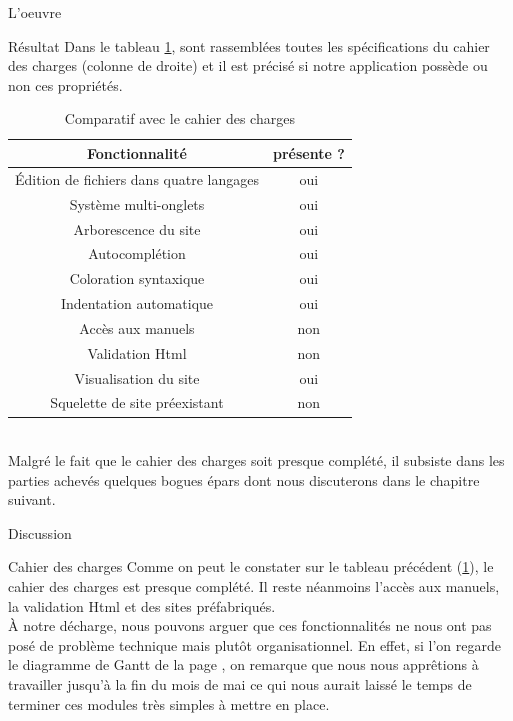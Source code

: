 \documentclass[a4paper, 12pt]{report}
\begin{document}
\begin{part}{L'oeuvre}
\begin{chapter}{Résultat}
			Dans le tableau \ref{raisin}, sont rassemblées toutes les spécifications du cahier des charges (colonne de droite) et il est
			précisé si notre application possède ou non ces propriétés.\\
			\begin{table}[h]
			\caption{\label{raisin} Comparatif avec le cahier des charges}
			\centering
				\begin{tabular}{|c||c|} %
				  \hline
				  Fonctionnalité & présente ? \\
				  \hline
				  Édition de fichiers dans quatre langages & oui \\
				  Système multi-onglets & oui \\
				  Arborescence du site & oui \\
				  Autocomplétion & oui \\
				  Coloration syntaxique & oui \\
				  Indentation automatique & oui \\
				  Accès aux manuels & non \\
				  Validation \gls{Html} & non \\
				  Visualisation du site & oui \\
				  Squelette de site préexistant & non \\
				  \hline
				\end{tabular}
			\end{table}~\\

			Malgré le fait que le cahier des charges soit presque complété, il subsiste dans les parties achevés quelques \glspl{bogue} épars
			dont nous discuterons dans le chapitre suivant.
		\end{chapter}
		\begin{chapter}{Discussion}
			\begin{section}{Cahier des charges}
				Comme on peut le constater sur le tableau précédent (\ref{raisin}), le cahier des charges est presque complété.
				Il reste néanmoins l'accès aux manuels,	la validation \gls{Html} et des sites préfabriqués.\\
				À notre décharge, nous pouvons arguer que ces fonctionnalités ne nous ont pas posé de problème technique mais plutôt organisationnel.
				En effet, si l'on regarde le diagramme de Gantt de la page \pageref{flute}, on remarque que nous nous apprêtions à travailler
				jusqu'à la fin du mois de mai ce qui nous aurait laissé le temps de terminer ces modules très simples à mettre en place.\\



\end{section}
\end{chapter}
\end{part}
\end{document}
